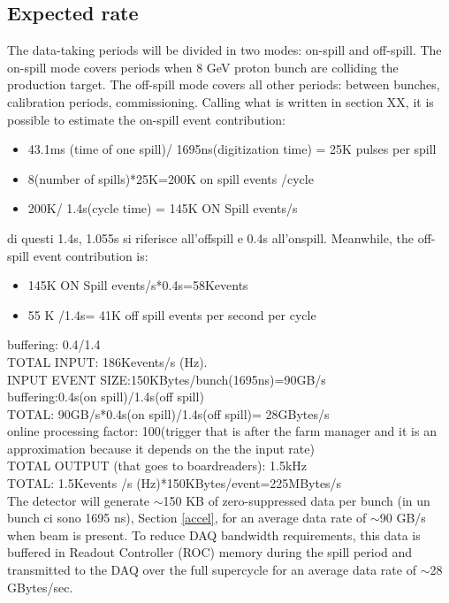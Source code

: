 \subsection{Expected rate}
The data-taking periods will be divided in two modes: on-spill and off-spill. The on-spill mode covers periods when 8 GeV proton bunch are colliding the production target. The off-spill mode covers all other periods: between bunches, calibration periods, commissioning. 
Calling what is written in section XX, it is possible to estimate the on-spill event contribution:
\begin{itemize}
    \item 43.1ms (time of one spill)/ 1695ns(digitization time) = 25K pulses per spill
    \item 8(number of spills)*25K=200K on spill events /cycle
    \item 200K/ 1.4s(cycle time) = 145K ON Spill events/s
\end{itemize}
di questi 1.4s, 1.055s si riferisce all'offspill e 0.4s all'onspill.
Meanwhile, the off-spill event contribution is:
\begin{itemize}
    \item 145K ON Spill events/s*0.4s=58Kevents
    \item 55 K /1.4s= 41K off spill events per second per cycle
\end{itemize}
buffering: 0.4/1.4
\\
TOTAL INPUT: 186Kevents/s (Hz).
\\
INPUT EVENT SIZE:150KBytes/bunch(1695ns)=90GB/s
\\
buffering:0.4s(on spill)/1.4s(off spill)
\\
TOTAL: 90GB/s*0.4s(on spill)/1.4s(off spill)= 28GBytes/s
\\
online processing factor: 100(trigger that is after the farm manager and it is an approximation because it depends on the the input rate)
\\
TOTAL OUTPUT (that goes to boardreaders): 1.5kHz
\\
TOTAL: 1.5Kevents /s (Hz)*150KBytes/event=225MBytes/s
\\
The detector will generate $\sim$150 KB of zero-suppressed data per bunch (in un bunch ci sono 1695 ns), Section \ref{accel}, for an average data rate of $\sim$90 GB/s when beam is present. To reduce DAQ bandwidth requirements, this data is buffered in Readout
Controller (ROC) memory during the spill period and transmitted to the DAQ over the full supercycle for an average data rate of $\sim$28 GBytes/sec.

